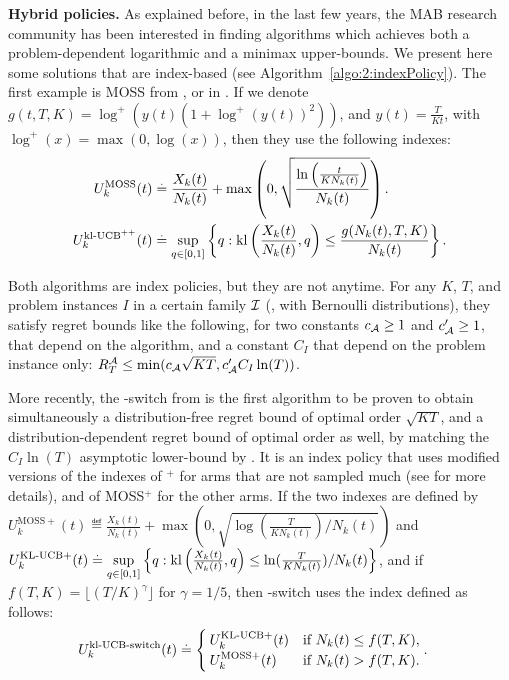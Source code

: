 \textbf{Hybrid policies.}
%
As explained before, in the last few years, the MAB research community has been interested in finding algorithms which achieves both a problem-dependent logarithmic and a minimax upper-bounds.
We present here some solutions that are index-based (see Algorithm~\ref{algo:2:indexPolicy}).
The first example is MOSS from \cite{Audibert2009minimax}, or \KLUCBpp{} in \cite{Menard17}.
If we denote $g(t, T, K) = \log^+(y(t) (1 + \log^+(y(t))^2))$, and $y(t) = \frac{T}{K t}$, with $\log^+(x) = \max(0, \log(x))$,
then they use the following indexes:
\vspace*{-5pt} %
\begin{align*}\label{eq:2:indexes_for_MOSS_klUCBpp}
    U^{\mathrm{MOSS}}_k(t) & \overset{.}{=} \frac{X_k(t)}{N_k(t)} + \max\left(0, \sqrt{ \frac{\ln\left(\frac{t}{K N_k(t)}\right)}{N_k(t)} } \right). \\
    U^{\mathrm{kl}\text{-}\mathrm{UCB}^{++}}_k(t) & \overset{.}{=} \sup\limits_{q \in [0,1]} \left\{ q : \mathrm{kl}\left(\frac{X_k(t)}{N_k(t)}, q\right) \leq \frac{g(N_k(t), T, K)}{N_k(t)} \right\}.
\end{align*}

Both algorithms are index policies, but they are not anytime.
For any $K$, $T$, and problem instances $I$ in a certain family $\mathcal{I}$ (\eg, with Bernoulli distributions),
they satisfy regret bounds like the following, for two constants $c_{\mathcal{A}} \geq 1$ and $c'_{\mathcal{A}} \geq 1$, that depend on the algorithm, and a constant $C_I$ that depend on the problem instance only: $R_T^{\mathcal{A}} \leq \min( c_{\mathcal{A}} \sqrt{K T}, c'_{\mathcal{A}} C_I \ln(T))$.

More recently, the \klUCB-switch from \cite{GarivierHadiji2018} is the first algorithm to be proven to
obtain simultaneously a distribution-free regret bound of optimal order $\sqrt{KT}$, and a distribution-dependent regret bound of optimal order as well, by matching the $C_I \ln(T)$ asymptotic lower-bound by \cite{LaiRobbins85}.
It is an index policy that uses modified versions of the indexes of \klUCB$^+$ for arms that are not sampled much (see \cite{Honda2019} for more details), and of MOSS$^+$ for the other arms.
If the two indexes
are defined by
$U^{\mathrm{MOSS}+}_k(t) \eqdef \frac{X_k(t)}{N_k(t)} + \max (0, \sqrt{ \log\left(\frac{T}{K N_k(t)}\right) / N_k(t)} )$
and
$U^{\mathrm{KL}\text{-}\mathrm{UCB}+}_k(t) \overset{.}{=} \sup\limits_{q \in [0,1]} \left\{ q : \mathrm{kl}\left(\frac{X_k(t)}{N_k(t)}, q\right) \leq \ln(\frac{T}{K N_k(t)}) / N_k(t) \right\}$,
and if $f(T, K) = \lfloor (T/K)^{\gamma}\rfloor$ for $\gamma=1/5$,
then \klUCB-switch uses the index defined as follows:
\begin{align*}
    U^{\mathrm{kl}\text{-}\mathrm{UCB}\text{-}\mathrm{switch}}_k(t) & \overset{.}{=} \begin{cases}
        U^{\mathrm{KL}\text{-}\mathrm{UCB}+}_k(t) & \text{if } N_k(t) \leq f(T, K), \\
        U^{\mathrm{MOSS}+}_k(t) & \text{if } N_k(t) > f(T, K).
    \end{cases}.
\end{align*}
%

